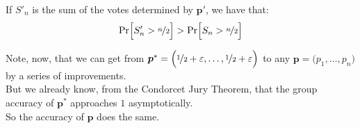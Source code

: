 \documentclass[preview, border={0pt 5pt 3pt 1pt}, varwidth=14cm]{standalone} %
\begin{document}
    If \(S'_n\) is the sum of the votes determined by \(\bm{p}'\), we have that: 
    \[
      {\Pr}\Big[ S'_n > \nicefrac{n}{2}\Big] > {\Pr}\Big[ S_n > \nicefrac{n}{2}\Big]
    \]

    Note, now, that we can get from \(\bm{p}^* = \Big(\nicefrac{1}{2} + \varepsilon, \dots, \nicefrac{1}{2} + \varepsilon \Big)\)
    to any \(\bm{p} = \Big(p_1, \dots, p_n\Big)\) by a series of improvements.\\

    But we already know, from the Condorcet Jury Theorem, that the group accuracy of \(\bm{p}^*\) approaches \(1\) asymptotically.\\

    So the accuracy of \(\bm{p}\) does the same.\\








\end{document}
